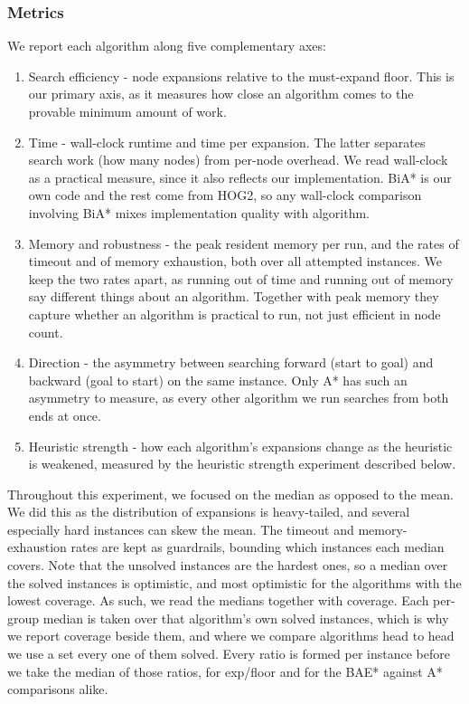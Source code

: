 \documentclass[letterpaper]{article} %
\begin{document}
\subsubsection{Metrics}
We report each algorithm along five complementary axes:
\begin{enumerate}
  \item[(A)] Search efficiency - node expansions relative to the must-expand floor. This is our primary axis, as it measures how close an algorithm comes to the provable minimum amount of work.
  \item[(B)] Time - wall-clock runtime and time per expansion. The latter separates search work (how many nodes) from per-node overhead. We read wall-clock as a practical measure, since it also reflects our implementation. BiA* is our own code and the rest come from HOG2, so any wall-clock comparison involving BiA* mixes implementation quality with algorithm.
  \item[(C)] Memory and robustness - the peak resident memory per run, and the rates of timeout and of memory exhaustion, both over all attempted instances. We keep the two rates apart, as running out of time and running out of memory say different things about an algorithm. Together with peak memory they capture whether an algorithm is practical to run, not just efficient in node count.
  \item[(D)] Direction - the asymmetry between searching forward (start to goal) and backward (goal to start) on the same instance. Only A* has such an asymmetry to measure, as every other algorithm we run searches from both ends at once.
  \item[(E)] Heuristic strength - how each algorithm's expansions change as the heuristic is weakened, measured by the heuristic strength experiment described below.
\end{enumerate} Throughout this experiment, we focused on the median as opposed to the mean. We did this as the distribution of expansions is heavy-tailed, and several especially hard instances can skew the mean. The timeout and memory-exhaustion rates are kept as guardrails, bounding which instances each median covers. Note that the unsolved instances are the hardest ones, so a median over the solved instances is optimistic, and most optimistic for the algorithms with the lowest coverage. As such, we read the medians together with coverage. Each per-group median is taken over that algorithm's own solved instances, which is why we report coverage beside them, and where we compare algorithms head to head we use a set every one of them solved. Every ratio is formed per instance before we take the median of those ratios, for exp/floor and for the BAE* against A* comparisons alike.
\end{document}
